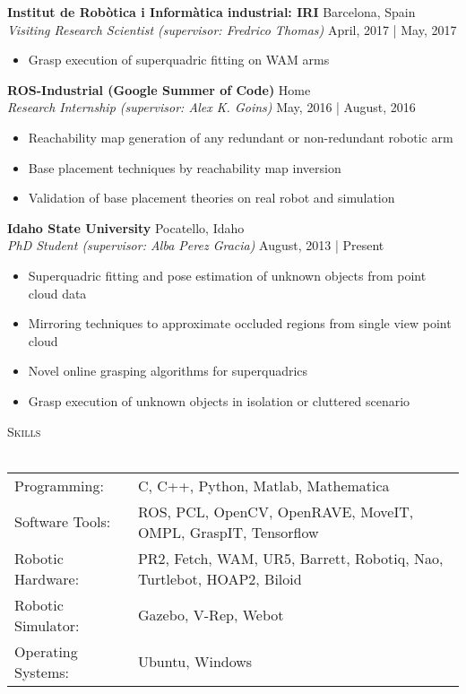 \documentclass[a4paper]{article}
\newcommand{\lineunder} {
    \vspace*{-8pt} \\
    \hspace*{-18pt} \hrulefill \\
}
\newcommand{\header} [1] {
    {\hspace*{-18pt}\vspace*{6pt} \textsc{#1}}
    \vspace*{-6pt} \lineunder
}
\begin{document}
\textbf{Institut de Rob\`{o}tica i Inform\`{a}tica industrial: IRI} \hfill Barcelona, Spain\\
\textit{Visiting Research Scientist (supervisor: Fredrico Thomas)} \hfill April, 2017 | May, 2017\\
\vspace{-1mm}
\begin{itemize} \itemsep 1pt
	\item Grasp execution of superquadric fitting on WAM arms
\end{itemize}

\textbf{ROS-Industrial (Google Summer of Code)} \hfill Home\\
\textit{Research Internship (supervisor: Alex K. Goins)} \hfill May, 2016 | August, 2016\\
\vspace{-1mm}
\begin{itemize} \itemsep 1pt
	\item Reachability map generation of any redundant or non-redundant robotic arm
	\item Base placement techniques by reachability map inversion
	\item Validation of base placement theories on real robot and simulation
\end{itemize}

\textbf{Idaho State University} \hfill Pocatello, Idaho\\
\textit{PhD Student (supervisor: Alba Perez Gracia)} \hfill August, 2013 | Present\\
\vspace{-1mm}
\begin{itemize} \itemsep 1pt
	\item Superquadric fitting and pose estimation of unknown objects from point cloud data
	\item Mirroring techniques to approximate occluded regions from single view point cloud
	\item Novel online grasping algorithms for superquadrics
	\item Grasp execution of unknown objects in isolation or cluttered scenario
\end{itemize}

\header{Skills}
\begin{tabular}{ l l }
	Programming:       & C, C++, Python, Matlab, Mathematica                                   \\
	Software Tools:    & ROS, PCL, OpenCV, OpenRAVE, MoveIT, OMPL, GraspIT, Tensorflow         \\
	Robotic Hardware:  & PR2, Fetch, WAM, UR5, Barrett, Robotiq, Nao, Turtlebot, HOAP2, Biloid \\
	Robotic Simulator: & Gazebo, V-Rep, Webot                                                  \\
	Operating Systems: & Ubuntu, Windows                                                       \\
\end{tabular}
\end{document}
